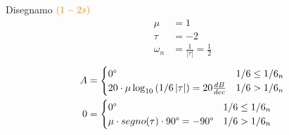 \documentclass[a4paper]{article}
\begin{document}
\begin{example}
    \vspace{1em}
    \noindent
    Disegnamo \( \color{orange} \left( 1 - 2s \right)  \)
    \[
    \begin{aligned}
      \mu &= 1\\
      \tau &= -2\\
      \omega_n &= \frac{1}{|\tau|} = \frac{1}{2}
    \end{aligned}
    \] 
    \[
    \begin{aligned}
      A &= \begin{cases}
        0\degree & 1/6 \le 1/6_n\\
        20 \cdot \mu \log_{10} \left( 1/6 \left| \tau \right|  \right) = 20 \frac{dB}{dec} & 1/6 > 1/6_n
      \end{cases}\\
        0 &= \begin{cases}
          0\degree & 1/6 \le 1/6_n\\
          \mu \cdot segno(\tau) \cdot 90\degree = -90\degree & 1/6 > 1/6_n
        \end{cases}
    \end{aligned}
    \] 
    \label{12-12-D5}
\end{example}
\end{document}
